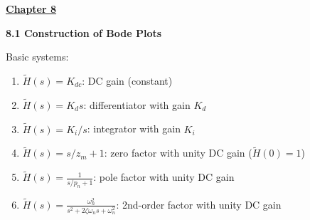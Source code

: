 \documentclass[landscape,a4paper]{extarticle}
\begin{document}
\begin{multicols*}{5}
    \textbf{\uline{Chapter 8}}


    \textbf{8.1 Construction of Bode Plots}


    Basic systems:
    \begin{enumerate}
        \item $\tilde{H}(s) = K_{dc}$: DC gain (constant)
        \item $\tilde{H}(s) = K_d s$: differentiator with gain $K_d$
        \item $\tilde{H}(s) = K_i/s$: integrator with gain $K_i$
        \item $\tilde{H}(s) = s/z_m + 1$: zero factor with unity DC gain ($\tilde{H}(0) = 1$)
        \item $\tilde{H}(s) = \frac{1}{s/p_n + 1}$: pole factor with unity DC gain
        \item $\tilde{H}(s) = \frac{\omega_n^2}{s^2+2\zeta\omega_ns + \omega_n^2}$: 2nd-order factor with unity DC gain
    \end{enumerate}


\end{multicols*}
\end{document}
